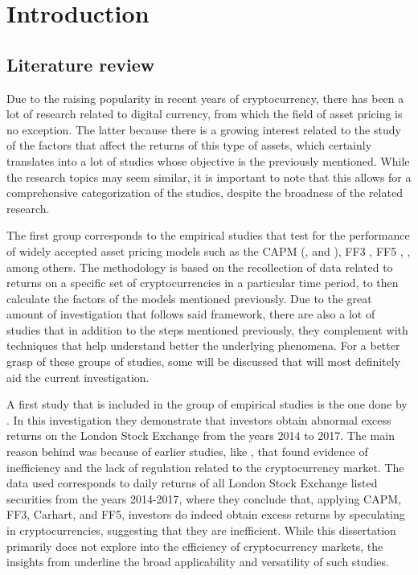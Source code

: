 
\chapter{Introduction}
\label{c1} %

\section{Literature review}
Due to the raising popularity in recent years of cryptocurrency, there has been a lot of research related to digital currency, from which the field of asset pricing is no exception. The latter because there is a growing interest related to the study of the factors that affect the returns of this type of assets, which certainly translates into a lot of studies whose objective is the previously mentioned. While the research topics may seem similar, it is important to note that this allows for a comprehensive categorization of the studies, despite the broadness of the related research.

The first group corresponds to the empirical studies that test for the performance of widely accepted asset pricing models such as the CAPM (\cite{sharpe1964}, \cite{Lintner1965} and \cite{mossin1966equilibrium}), FF3 \parencite{fama1993}, FF5 \parencite{fama2015}, \parencite{carhart1997}, among others. The methodology is based on the recollection of data related to returns on a specific set of cryptocurrencies in a particular time period, to then calculate the factors of the models mentioned previously. Due to the great amount of investigation that follows said framework, there are also a lot of studies that in addition to the steps mentioned previously, they complement with techniques that help understand better the underlying phenomena. For a better grasp of these groups of studies, some will be discussed that will most definitely aid the current investigation.

A first study that is included in the group of empirical studies is the one done by \parencite{gregoriou2019cryptocurrencies}. In this investigation they demonstrate that investors obtain abnormal excess returns on the London Stock Exchange from the years 2014 to 2017. The main reason behind was because of earlier studies, like \parencite{bariviera2017inefficiency}, that found evidence of inefficiency and the lack of regulation related to the cryptocurrency market. The data used corresponds to daily returns of all London Stock Exchange listed securities from the years 2014-2017, where they conclude that, applying CAPM, FF3, Carhart, and FF5, investors do indeed obtain excess returns by speculating in cryptocurrencies, suggesting that they are inefficient. While this dissertation primarily does not explore into the efficiency of cryptocurrency markets, the insights from \parencite{gregoriou2019cryptocurrencies} underline the broad applicability and versatility of such studies.

